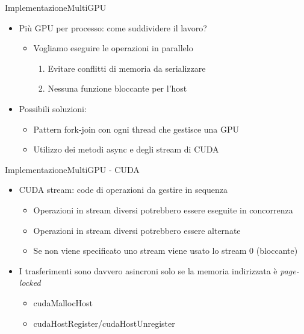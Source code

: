 \documentclass{beamer}
\begin{document}
\begin{frame}{Implementazione}{MultiGPU}
    \begin{itemize}
        \item Più GPU per processo: come suddividere il lavoro?
              \begin{itemize}
                  \item Vogliamo eseguire le operazioni in parallelo
                        \begin{enumerate}
                            \item Evitare conflitti di memoria da serializzare
                            \item Nessuna funzione bloccante per l'host
                        \end{enumerate}
              \end{itemize}
        \item Possibili soluzioni:
              \begin{itemize}
                  \item Pattern fork-join con ogni thread che gestisce una GPU
                  \item \alert{Utilizzo dei metodi async e degli stream di CUDA}
              \end{itemize}
    \end{itemize}
\end{frame}


\begin{frame}{Implementazione}{MultiGPU - CUDA}
    \begin{itemize}
        \item CUDA stream: code di operazioni da gestire in sequenza
              \begin{itemize}
                  \item Operazioni in stream diversi potrebbero essere eseguite in concorrenza
                  \item Operazioni in stream diversi potrebbero essere alternate
                  \item Se non viene specificato uno stream viene usato lo stream 0 (bloccante)
              \end{itemize}
        \item I trasferimenti sono davvero asincroni solo se la memoria indirizzata è \textit{page-locked}
              \begin{itemize}
                  \item cudaMallocHost
                  \item cudaHostRegister/cudaHostUnregister
              \end{itemize}
    \end{itemize}
\end{frame}
\end{document}
